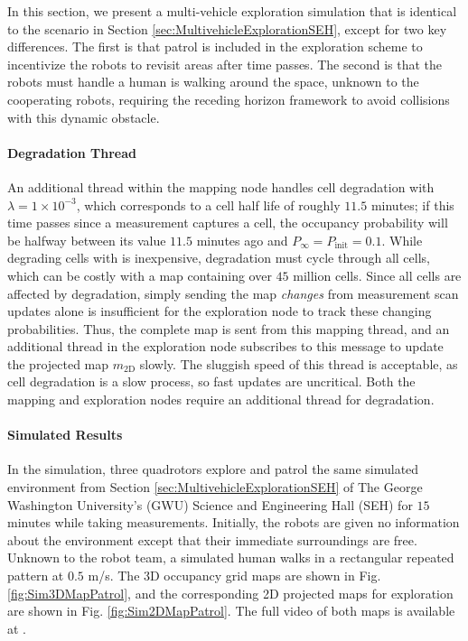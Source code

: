 In this section, we present a multi-vehicle exploration simulation that is identical to the scenario in Section \ref{sec:MultivehicleExplorationSEH}, except for two key differences. The first is that patrol is included in the exploration scheme to incentivize the robots to revisit areas after time passes. The second is that the robots must handle a human is walking around the space, unknown to the cooperating robots, requiring the receding horizon framework to avoid collisions with this dynamic obstacle.

\paragraph{Degradation Thread}
An additional thread within the mapping node handles cell degradation with $\lambda=1\times10^{-3}$, which corresponds to a cell half life of roughly $11.5$ minutes; if this time passes since a measurement captures a cell, the occupancy probability will be halfway between its value $11.5$ minutes ago and $P_\infty=P_\text{init}=0.1$. While degrading cells with  is inexpensive, degradation must cycle through all cells, which can be costly with a map containing over $45$ million cells. Since all cells are affected by degradation, simply sending the map \emph{changes} from measurement scan updates alone is insufficient for the exploration node to track these changing probabilities. Thus, the complete map is sent from this mapping thread, and an additional thread in the exploration node subscribes to this message to update the projected map $m_\text{2D}$ slowly. The sluggish speed of this thread is acceptable, as cell degradation is a slow process, so fast updates are uncritical. Both the mapping and exploration nodes require an additional thread for degradation.


\paragraph{Simulated Results}

In the simulation, three quadrotors explore and patrol the same simulated environment from Section \ref{sec:MultivehicleExplorationSEH} of The George Washington University's (GWU) Science and Engineering Hall (SEH) for $15$ minutes while taking measurements. Initially, the robots are given no information about the environment except that their immediate surroundings are free. Unknown to the robot team, a simulated human walks in a rectangular repeated pattern at $0.5$ m/s. The 3D occupancy grid maps are shown in Fig. \ref{fig:Sim3DMapPatrol}, and the corresponding 2D projected maps for exploration are shown in Fig. \ref{fig:Sim2DMapPatrol}. The full video of both maps is available at \href{https://youtu.be/bsLG2romP_8}{}.




